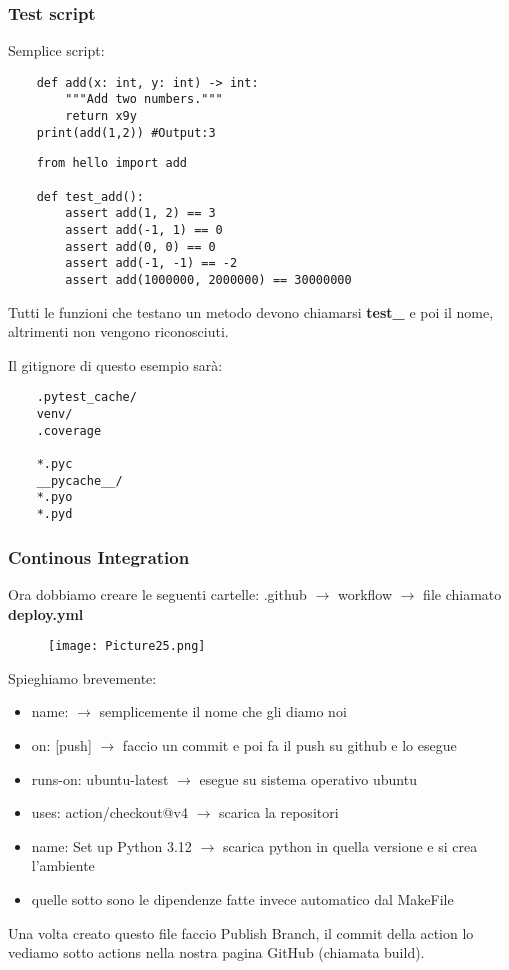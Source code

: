 \documentclass[a4paper,12pt]{article}
\begin{document}
\subsubsection{Test script} 
Semplice script:
\begin{lstlisting}
    def add(x: int, y: int) -> int:
        """Add two numbers."""
        return x9y
    print(add(1,2)) #Output:3
\end{lstlisting}

\begin{lstlisting}
    from hello import add

    def test_add():
        assert add(1, 2) == 3
        assert add(-1, 1) == 0
        assert add(0, 0) == 0
        assert add(-1, -1) == -2
        assert add(1000000, 2000000) == 30000000
\end{lstlisting}
Tutti le funzioni che testano un metodo devono chiamarsi \textbf{test\_} e poi il nome, altrimenti non vengono riconosciuti.

Il gitignore di questo esempio sarà: 
\begin{lstlisting}
    .pytest_cache/
    venv/
    .coverage

    *.pyc 
    __pycache__/
    *.pyo
    *.pyd
\end{lstlisting}

\newpage
\subsubsection{Continous Integration}
Ora dobbiamo creare le seguenti cartelle: .github $\rightarrow$ workflow $\rightarrow$ file chiamato \textbf{deploy.yml}
\begin{figure}[H]
  \centering
  \texttt{[image: Picture25.png]}
  \label{etichetta25}
\end{figure}
Spieghiamo brevemente: 
\begin{itemize}
    \item name: $\rightarrow$ semplicemente il nome che gli diamo noi 
    \item on: [push] $\rightarrow$ faccio un commit e poi fa il push su github e lo esegue 
    \item runs-on: ubuntu-latest $\rightarrow$ esegue su sistema operativo ubuntu
    \item uses: action/checkout@v4 $\rightarrow$ scarica la repositori 
    \item name: Set up Python 3.12 $\rightarrow$ scarica python in quella versione e si crea l'ambiente
    \item quelle sotto sono le dipendenze fatte invece automatico dal MakeFile
\end{itemize}
Una volta creato questo file faccio Publish Branch, il commit della action lo vediamo sotto actions nella nostra pagina GitHub (chiamata build).
\end{document}
